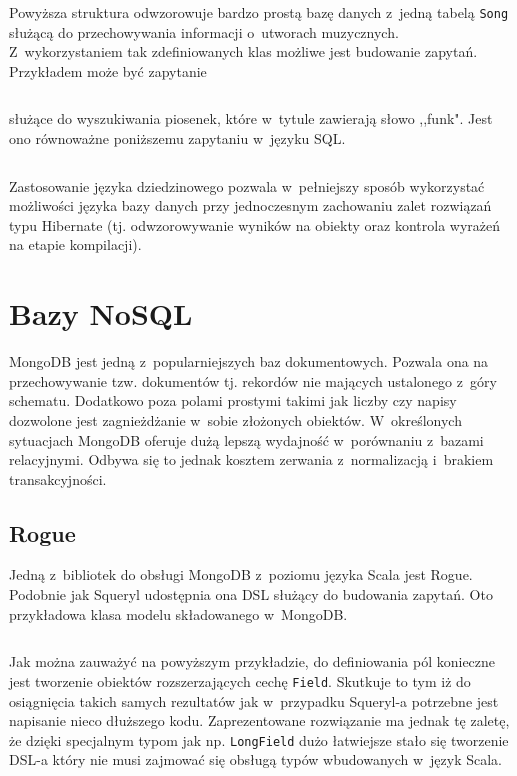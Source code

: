 \documentclass[brudnopis]{xmgr}
\begin{document}
\inputminted{scala}{listings/scala/squeryl-schema.scala}

Powyższa struktura odwzorowuje bardzo prostą bazę danych z~jedną tabelą \texttt{Song} służącą do przechowywania informacji o~utworach muzycznych. Z~wykorzystaniem tak zdefiniowanych klas możliwe jest budowanie zapytań. Przykładem może być zapytanie

\inputminted{scala}{listings/scala/squeryl-query.scala}

\noindent służące do wyszukiwania piosenek, które w~tytule zawierają słowo ,,funk". Jest ono równoważne poniższemu zapytaniu w~języku SQL.

\inputminted{sql}{listings/sql/squeryl-query.sql}

Zastosowanie języka dziedzinowego pozwala w~pełniejszy sposób wykorzystać możliwości języka bazy danych przy jednoczesnym zachowaniu zalet rozwiązań typu Hibernate (tj. odwzorowywanie wyników na obiekty oraz kontrola wyrażeń na etapie kompilacji).

\section{Bazy NoSQL}

MongoDB jest jedną z~popularniejszych baz dokumentowych. Pozwala ona na przechowywanie tzw. dokumentów tj. rekordów nie mających ustalonego z~góry schematu. Dodatkowo poza polami prostymi takimi jak liczby czy napisy dozwolone jest zagnieżdżanie w~sobie złożonych obiektów. W~określonych sytuacjach MongoDB oferuje dużą lepszą wydajność w~porównaniu z~bazami relacyjnymi. Odbywa się to jednak kosztem zerwania z~normalizacją i~brakiem transakcyjności.

\subsection{Rogue}

Jedną z~bibliotek do obsługi MongoDB z~poziomu języka Scala jest Rogue. Podobnie jak Squeryl udostępnia ona DSL służący do budowania zapytań. Oto przykładowa klasa modelu składowanego w~MongoDB.

\inputminted{scala}{listings/scala/rogue-model.scala}

Jak można zauważyć na powyższym przykładzie, do definiowania pól konieczne jest tworzenie obiektów rozszerzających cechę \texttt{Field}. Skutkuje to tym iż do osiągnięcia takich samych rezultatów jak w~przypadku Squeryl-a potrzebne jest napisanie nieco dłuższego kodu. Zaprezentowane rozwiązanie ma jednak tę zaletę, że dzięki specjalnym typom jak np. \texttt{LongField} dużo łatwiejsze stało się tworzenie DSL-a który nie musi zajmować się obsługą typów wbudowanych w~język Scala.
\end{document}
